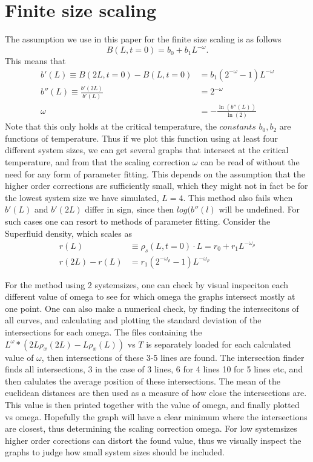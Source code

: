 \documentclass[a4paper]{article}
\begin{document}
\section{Finite size scaling}
The assumption we use in this paper for the finite size scaling is as follows
\begin{equation}
  B(L,t=0) = b_0 + b_1L^{-\omega}.
\end{equation}
This means that
\begin{align}
  b'(L) \equiv B(2L,t=0) - B(L,t=0) &= b_1(2^{-\omega} -1)L^{-\omega}\\
  b''(L)\equiv \frac{b'(2L)}{b'(L)} &= 2^{-\omega}\\
  \omega &= -\frac{\ln(b''(L))}{\ln(2)}
\end{align}
Note that this only holds at the critical temperature, the $\textit{constants}$ $b_0, b_2$ are functions of temperature. Thus if we plot this function using at least four different system sizes, we can get several graphs that intersect at the critical temperature, and from that the scaling correction $\omega$ can be read of without the need for any form of parameter fitting. This depends on the assumption that the higher order corrections are sufficiently small, which they might not in fact be for the lowest system size we have simulated, $L=4$. This method also fails when $b'(L)$ and $b'(2L)$ differ in sign, since then $log(b''(l)$ will be undefined.
For such cases one can resort to methods of parameter fitting.
Consider the Superfluid density, which scales as 
\begin{align}
  r(L)&\equiv \rho_s(L,t=0) \cdot L = r_0 + r_1L^{-\omega_\rho}\\
  r(2L) - r(L) &= r_1(2^{-\omega_\rho} -1)L^{-\omega_\rho}
\end{align}


For the method using 2 systemsizes, one can check by visual inspeciton each different value of omega to see for which omega the graphs intersect mostly at one point. One can also make a numerical check, by finding the intersecitons of all curves, and calculating  and plotting the standard deviation of the intersections for each omega.
The files containing the $L^{\omega}*(2L\rho_x(2L) - L\rho_x(L))$ vs $T$ is separately loaded for each calculated value of $\omega$, then intersections of these 3-5 lines are found. 
The intersection finder finds all intersections, 3 in the case of 3 lines, 6 for 4 lines 10 for 5 lines etc, and then calulates the average position of these intersections. The mean of the euclidean distances are then used as a measure of how close the intersections are. This value is then printed together with the value of omega, and finally plotted vs omega.
Hopefully the graph will have a clear minimum where the intersections are closest, thus determining the scaling correction omega. For low systemsizes higher order corections can distort the found value, thus we visually inspect the graphs to judge how small system sizes should be included. 
\end{document}
